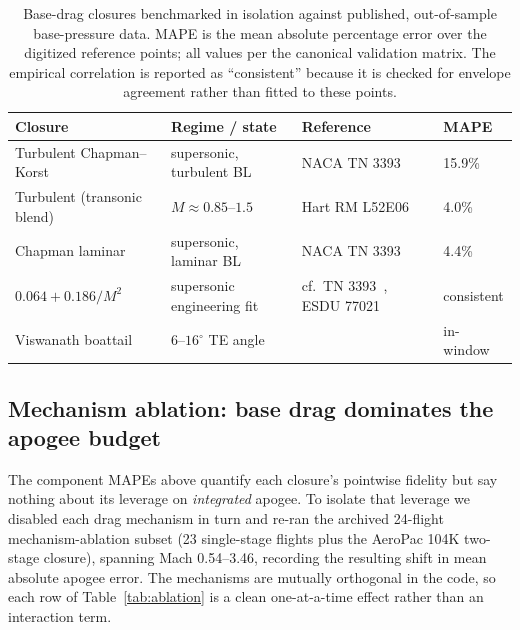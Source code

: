 \begin{table}[htbp]
\centering
\caption{Base-drag closures benchmarked in isolation against published,
out-of-sample base-pressure data. MAPE is the mean absolute percentage error
over the digitized reference points; all values per the canonical validation
matrix. The empirical correlation is reported as ``consistent'' because it is
checked for envelope agreement rather than fitted to these points.}
\label{tab:component}
\small
\setlength{\tabcolsep}{4pt}
\begin{tabularx}{\textwidth}{@{}l l X l@{}}
\toprule
Closure & Regime / state & Reference & MAPE \\
\midrule
Turbulent Chapman--Korst & supersonic, turbulent BL & NACA TN 3393~\cite{chapman1955} & 15.9\% \\
Turbulent (transonic blend) & $M\!\approx\!0.85$--$1.5$ & Hart RM L52E06~\cite{hart1952basedrag} & 4.0\% \\
Chapman laminar & supersonic, laminar BL & NACA TN 3393~\cite{chapman1955} & 4.4\% \\
$0.064 + 0.186/M^2$ & supersonic engineering fit & cf.\ TN 3393~\cite{chapman1955}, ESDU 77021~\cite{esdu77021} & consistent \\
Viswanath boattail & $6$--$16^{\circ}$ TE angle & \cite{viswanath1996} & in-window \\
\bottomrule
\end{tabularx}
\end{table}

\subsection{Mechanism ablation: base drag dominates the apogee budget}
\label{subsec:ablation}

The component MAPEs above quantify each closure's pointwise fidelity but say
nothing about its leverage on \emph{integrated} apogee. To isolate that
leverage we disabled each drag mechanism in turn and re-ran the archived
24-flight mechanism-ablation subset (23 single-stage flights plus the AeroPac
104K two-stage closure), spanning Mach 0.54--3.46, recording the resulting shift
in mean absolute apogee error. The mechanisms are mutually orthogonal in the
code, so each row of Table~\ref{tab:ablation} is a clean one-at-a-time effect
rather than an interaction term.

